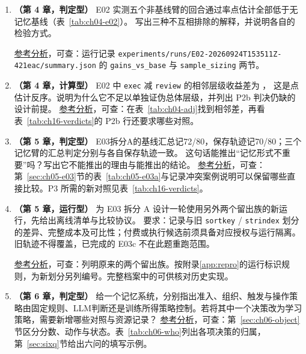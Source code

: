 \begin{enumerate}[label=G\arabic*.]
  \item\label{ex:g07} \textbf{（第 4 章，判定型）}
        E02 实测五个非基线臂的回合通过率点估计全部低于无记忆基线（表~\ref{tab:ch04-e02}）。
        写出三种不互相排除的解释，并说明各自的检验方式。
        \begin{sloppypar}
        \hyperref[sol:g07]{参考分析}，可查：运行记录 \nolinkurl{experiments/runs/E02-20260924T153511Z-421eac/summary.json} 的
        \texttt{gains\_vs\_base} 与 \texttt{sample\_sizing} 两节。
        \end{sloppypar}

  \item\label{ex:g08} \textbf{（第 4 章，计算型）}
        E02 中 \texttt{exec} 减 \texttt{review} 的相邻层级收益差为 ，
        这是点估计反序。说明为什么它不足以单独证伪总体层级，并列出 P2b 判决仍缺的设计前提。
        \hyperref[sol:g08]{参考分析}，可查：在表~\ref{tab:ch04-adj}找到相邻差，再看表~\ref{tab:ch16-verdicts}的 P2b 行还要求哪些对照。

  \item\label{ex:g09} \textbf{（第 5 章，判定型）}
        E03拆分A的基线汇总记72/80，保存轨迹记70/80；三个记忆臂的汇总判定分别与各自保存轨迹一致。
        这句话能推出“记忆形式不重要”吗？写出它不能推出的理由与能推出的结论。
        \hyperref[sol:g09]{参考分析}，可查：第~\ref{sec:ch05-e03}节的表~\ref{tab:ch05-e03a}与记录冲突案例说明可以保留哪些直接比较。P3 所需的新对照见表~\ref{tab:ch16-verdicts}。

  \item\label{ex:g10} \textbf{（第 5 章，运行型）}
        为 E03 拆分 A 设计一轮使用另外两个留出族的新运行，先给出离线清单与比较协议。
        要求：记录与旧 \texttt{sortkey} / \texttt{strindex} 划分的差异、完整成本及可比性；付费或执行候选前须具备对应授权与运行隔离。旧轨迹不得覆盖，已完成的 E03c 不在此题重跑范围。
        \begin{sloppypar}
        \hyperref[sol:g10]{参考分析}，可查：列明原来的两个留出族。按附录\ref{app:repro}的运行标识规则，为新划分另列编号。完整档案中的可供核对历史实现。
        \end{sloppypar}

  \item\label{ex:g11} \textbf{（第 6 章，判定型）}
        给一个记忆系统，分别指出准入、组织、触发与操作策略由固定规则、LLM判断还是训练所得策略控制。若将其中一个决策改为学习策略，需要新增哪些对照与资源记录？
        \hyperref[sol:g11]{参考分析}，可查：第~\ref{sec:ch06-object}节区分分数、动作与状态。表~\ref{tab:ch06-who}列出各项决策的归属，第~\ref{sec:sixq}节给出六问的填写示例。


\end{enumerate}
